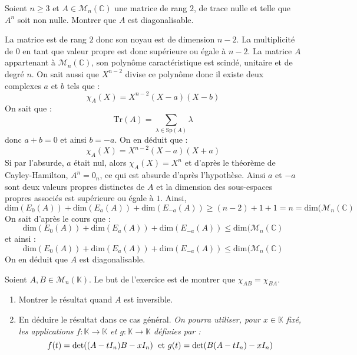 \documentclass[a4paper,10pt]{report}
\begin{document}
\begin{Exa} Soient $n \geq 3$ et $A \in \mathcal{M}_{n}(\mathbb{C})$ une matrice de rang $2$, de trace nulle et telle que $A^n$ soit non nulle. Montrer que $A$ est diagonalisable.
\end{Exa}

\corr La matrice est de rang $2$ donc son noyau est de dimension $n-2$. La multiplicité de $0$ en tant que valeur propre est donc supérieure ou égale à $n-2$. La matrice $A$ appartenant à $\mathcal{M}_{n}(\mathbb{C})$, son polynôme caractéristique est scindé, unitaire et de degré $n$. On sait aussi que $X^{n-2}$ divise ce polynôme donc il existe deux complexes $a$ et $b$ tels que :
$$ \chi_A(X)= X^{n-2} (X-a)(X-b)$$
On sait que :
$$ \textrm{Tr}(A) = \sum_{\lambda \in \textrm{Sp}(A)} \lambda$$
donc $a+b=0$ et ainsi $b=-a$. On en déduit que :
$$ \chi_A(X)= X^{n-2} (X-a)(X+a)$$
Si par l'absurde, $a$ était nul, alors $\chi_A(X)=X^n$ et d'après le théorème de Cayley-Hamilton, $A^n= 0_n$, ce qui est absurde d'après l'hypothèse. Ainsi $a$ et $-a$ sont deux valeurs propres distinctes de $A$ et la dimension des sous-espaces propres associés est supérieure ou égale à $1$. Ainsi,
$$ \textrm{dim}(E_0(A)) + \textrm{dim}(E_a(A)) + \textrm{dim}(E_{-a}(A)) \geq (n-2)+1+1 = n = \textrm{dim}(\mathcal{M}_n(\mathbb{C})$$
On sait d'après le cours que :
$$   \textrm{dim}(E_0(A)) + \textrm{dim}(E_a(A)) + \textrm{dim}(E_{-a}(A)) \leq \textrm{dim}(\mathcal{M}_n(\mathbb{C})$$
et ainsi :
$$   \textrm{dim}(E_0(A)) + \textrm{dim}(E_a(A)) + \textrm{dim}(E_{-a}(A)) \leq \textrm{dim}(\mathcal{M}_n(\mathbb{C})$$
On en déduit que $A$ est diagonalisable.

\begin{Exa} Soient $A,B \in \mathcal{M}_{n}(\mathbb{K})$. Le but de l'exercice est de montrer que $\chi_{AB} = \chi_{BA}$.
\begin{enumerate}
\item Montrer le résultat quand $A$ est inversible.
\item En déduire le résultat dans ce cas général. \textit{On pourra utiliser, pour $x \in \mathbb{K}$ fixé, les applications $f : \mathbb{K} \rightarrow \mathbb{K}$ et $g : \mathbb{K} \rightarrow \mathbb{K}$ définies par :}
$$ f(t) = \textrm{det}((A-t I_n)B -x I_n) \; \hbox{ et } g(t) = \textrm{det}(B(A-tI_n)-xI_n)$$
\end{enumerate}
\end{Exa}

\corr 
\end{document}
